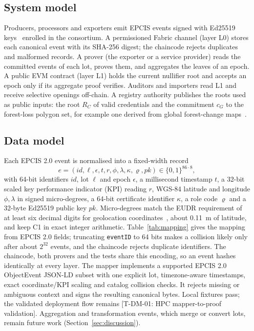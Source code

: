 \documentclass[runningheads]{llncs}
\newif\iffinal
\newcommand{\pending}[2]{\iffinal\errmessage{Unresolved pending result #1}\else{\color{red}[#1: #2]}\fi}
\newif\ifmarkrev
\newcommand{\rev}[1]{\ifmarkrev{\color{blue}#1}\else#1\fi}
\newcommand{\cG}{c_{G}}
\newcommand{\RC}{R_{C}}
\begin{document}
\subsection{System model}
Producers, processors and exporters emit EPCIS events signed with Ed25519 keys~\cite{bernstein2012ed25519} enrolled in the consortium. A permissioned Fabric channel (layer L0) stores each canonical event with its SHA-256 digest; the chaincode rejects duplicates and malformed records. A prover (the exporter or a service provider) reads the committed events of each lot, proves them, and aggregates the leaves of an epoch. A public EVM contract (layer L1) holds the current nullifier root and accepts an epoch only if its aggregate proof verifies. Auditors and importers read L1 and receive selective openings off-chain. A registry authority publishes the roots used as public inputs: the root $\RC$ of valid credentials and the commitment $\cG$ to the forest-loss polygon set, for example one derived from global forest-change maps~\cite{hansen2013forest}.

\subsection{Data model}
Each EPCIS 2.0 event is normalised into a fixed-width record
\[
e = (\mathit{id}, \ell, \epsilon, t, r, \phi, \lambda, \kappa, \varrho, \mathit{pk}) \in \{0,1\}^{86\cdot 8},
\]
with 64-bit identifiers $\mathit{id}$, lot $\ell$ and epoch $\epsilon$, a millisecond timestamp $t$, a 32-bit scaled key performance indicator (KPI) reading $r$, WGS-84 latitude and longitude $\phi,\lambda$ in signed micro-degrees, a 64-bit certificate identifier $\kappa$, a role code $\varrho$ and a 32-byte Ed25519 public key $\mathit{pk}$. \rev{Micro-degrees match the EUDR requirement of at least six decimal digits for geolocation coordinates~\cite[Art.~2(28)]{eudr2023}, about 0.11~m of latitude, and keep C1 in exact integer arithmetic.} Table~\ref{tab:mapping} gives the mapping from EPCIS 2.0 fields\rev{; truncating \texttt{eventID} to 64 bits makes a collision likely only after about $2^{32}$ events, and the chaincode rejects duplicate identifiers}. The chaincode, both provers and the tests share this encoding, so an event hashes identically at every layer. The mapper implements a supported EPCIS 2.0 ObjectEvent JSON-LD subset with one explicit lot, timezone-aware timestamps, exact coordinate/KPI scaling and catalog collision checks. It rejects missing or ambiguous context and signs the resulting canonical bytes. Local fixtures pass; the validated deployment flow remains \pending{T-DM-01}{HPC mapper-to-proof validation}. Aggregation and transformation events, which merge or convert lots, remain future work (Section~\ref{sec:discussion}).
\end{document}
